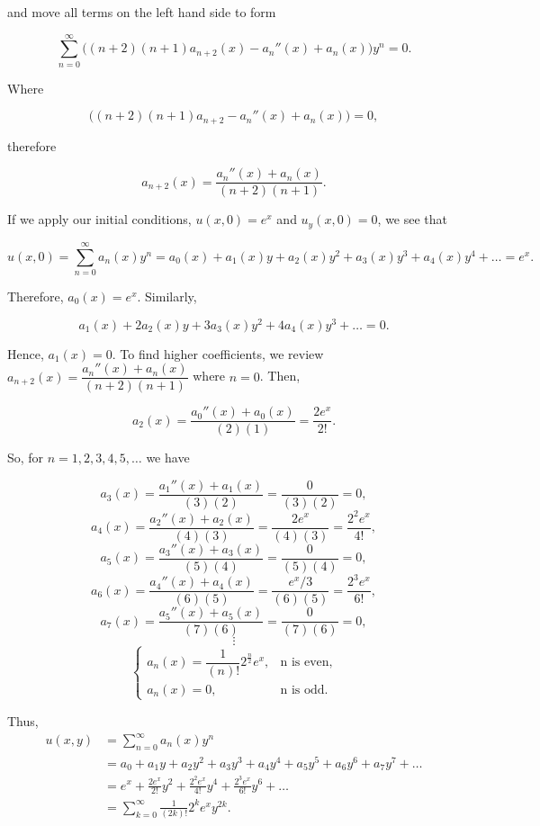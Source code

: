 \documentclass{article}
\begin{document}
\begin{flushleft}
and move all terms on the left hand side to form

$$\sum_{n=0}^{\infty}\Big((n+2)(n+1)a_{n+2}(x)-a_n''(x)+a_n(x)\Big)y^n=0.$$

Where 

$$\Big((n+2)(n+1)a_{n+2}-a_n''(x)+a_n(x)\Big)=0,$$

therefore

$$a_{n+2}(x)=\frac{a_n''(x)+a_n(x)}{(n+2)(n+1)}.$$

If we apply our initial conditions, $u(x,0)=e^x$ and $u_y(x,0)=0$, we see that

$$u(x,0)=\sum_{n=0}^{\infty}a_n(x)y^n=a_0(x) + a_1(x)y + a_2(x)y^2 + a_3(x)y^3 + a_4(x)y^4 + \dots = e^x.$$

Therefore, $a_0(x) = e^x$. Similarly,

$$a_1(x) + 2a_2(x)y + 3a_3(x)y^2 + 4a_4(x)y^3 + \dots =0. $$

Hence, $a_1(x)=0$. To find higher coefficients, we review $a_{n+2}(x)=\dfrac{a_n''(x)+a_n(x)}{(n+2)(n+1)}$ where $n=0$. Then,

$$a_2(x) = \frac{a_0''(x)+a_0(x)}{(2)(1)}=\frac{2e^x}{2!}.$$

So, for $n=1,2,3,4,5,\dots$ we have 

$$a_3(x) = \frac{a_1''(x)+a_1(x)}{(3)(2)}=\frac{0}{(3)(2)}=0,$$
$$a_4(x) = \frac{a_2''(x)+a_2(x)}{(4)(3)}=\frac{2e^x}{(4)(3)}=\frac{2^2e^x}{4!},$$
$$a_5(x) = \frac{a_3''(x)+a_3(x)}{(5)(4)}=\frac{0}{(5)(4)}=0,$$
$$a_6(x) = \frac{a_4''(x)+a_4(x)}{(6)(5)}=\frac{e^x/3}{(6)(5)}=\frac{2^3e^x}{6!},$$
$$a_7(x) = \frac{a_5''(x)+a_5(x)}{(7)(6)}=\frac{0}{(7)(6)}=0,$$
$$\vdots$$
\[ \begin{cases} 
      a_n(x)=\dfrac{1}{(n)!}2^{\frac{n}{2}}e^x ,& \text{n is even},\\
      a_n(x)=0,& \text{n is odd}.
   \end{cases}
\]

Thus,
\begin{equation*}
\begin{split}
u(x,y) & = \sum_{n=0}^{\infty}a_n(x)y^n \\
 & = a_0 + a_1y + a_2y^2 + a_3y^3 + a_4y^4 + a_5y^5 +a_6y^6 + a_7y^7 + \dots \\
 & = e^x + \frac{2e^x}{2!}y^2 + \frac{2^2e^x}{4!}y^4 + \frac{2^3e^x}{6!}y^6 + \dots \\
 & = \sum_{k=0}^{\infty} \frac{1}{(2k)!}2^ke^xy^{2k}.
 \end{split}
\end{equation*}




\end{flushleft}
\end{document}
